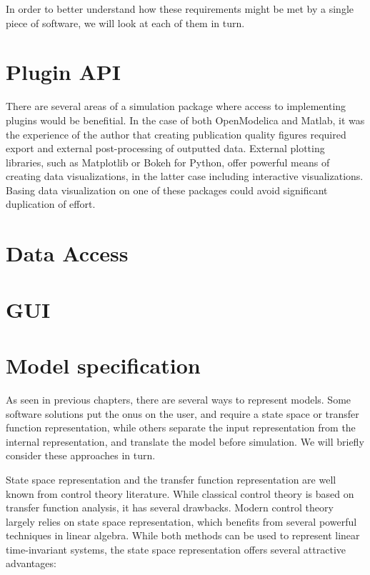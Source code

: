 \documentclass[\rootfolder/main.tex]{subfiles}
\begin{document}
In order to better understand how these requirements might be met by a single piece of software, we will look at each of them in turn.

\section{Plugin API}

There are several areas of a simulation package where access to implementing plugins would be benefitial.
In the case of both OpenModelica and Matlab, it was the experience of the author that creating publication quality figures required export and external post-processing of outputted data.
External plotting libraries, such as Matplotlib or Bokeh for Python, offer powerful means of creating data visualizations, in the latter case including interactive visualizations.
Basing data visualization on one of these packages could avoid significant duplication of effort.

\section{Data Access}

\section{GUI}

\section{Model specification}

As seen in previous chapters, there are several ways to represent models.
Some software solutions put the onus on the user, and require a state space or transfer function representation, while others separate the input representation from the internal representation, and translate the model before simulation.
We will briefly consider these approaches in turn.

State space representation and the transfer function representation are well known from control theory literature.
While classical control theory is based on transfer function analysis, it has several drawbacks.
Modern control theory largely relies on state space representation, which benefits from several powerful techniques in linear algebra.
While both methods can be used to represent linear time-invariant systems, the state space representation offers several attractive advantages:
\end{document}
